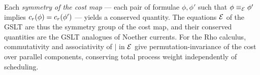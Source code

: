 \begin{remark}
Each \emph{symmetry of the cost map} --- each pair of formulae $\phi, \phi'$
such that $\phi \equiv_{\mathcal{E}} \phi'$ implies $c_r(\phi) = c_r(\phi')$
--- yields a conserved quantity.  The equations $\mathcal{E}$ of the GSLT are
thus the symmetry group of the cost map, and their conserved quantities
are the GSLT analogues of Noether currents.
For the Rho calculus, commutativity and associativity of $|$ in $\mathcal{E}$
give permutation-invariance of the cost over parallel components,
conserving total process weight independently of scheduling.
\end{remark}

